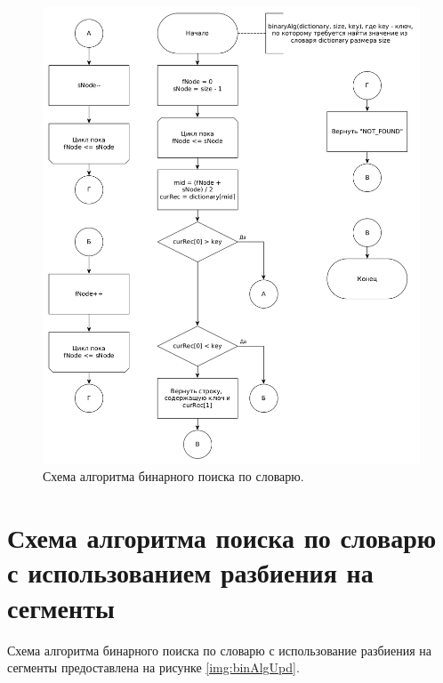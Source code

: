 \documentclass[12pt]{report}
\begin{document}
\begin{figure}
\begin{center}
\includegraphics[scale=0.4]{inc/img/binAlg.png}
\captionsetup{justification=centering}
	\caption{Схема алгоритма бинарного поиска по словарю.}
	\label{img:brutAlg}	
\end{center}
\end{figure}

\section{Схема алгоритма поиска по словарю с использованием разбиения на сегменты}
Схема алгоритма бинарного поиска по словарю с использование разбиения на сегменты предоставлена на рисунке \ref{img:binAlgUpd}.
\end{document}
